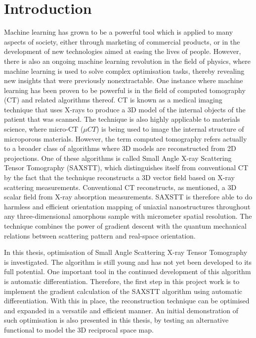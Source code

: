 \chapter{Introduction}


Machine learning has grown to be a powerful tool which is applied to many aspects of society,
either through marketing of commercial products, or in the development of new technologies aimed at easing the lives of people.
However, there is also an ongoing machine learning revolution in the field of physics,
where machine learning is used to solve complex optimisation tasks, thereby revealing new insights that were previously nonextractable.
One instance where machine learning has been proven to be powerful is in the field of computed tomography (CT) and related algorithms thereof.
CT is known as a medical imaging technique that uses X-rays to produce a 3D model of the internal objects of the patient that was scanned.
The technique is also highly applicable to materials science, where micro-CT ($\mu CT$) is being used to image the internal structure of microporous materials.
However, the term computed tomography refers actually to a broader class of algorithms where 3D models are reconstructed from 2D projections.
One of these algorithms is called Small Angle X-ray Scattering Tensor Tomography (SAXSTT), which distinguishes itself from conventional CT by the fact that the technique
reconstructs a 3D vector field based on X-ray scattering measurements. Conventional CT reconstructs, as mentioned, a 3D scalar field from X-ray absorption measurements.
SAXSTT is therefore able to do harmless and efficient orientation mapping of uniaxial nanostructures throughout any three-dimensional amorphous sample with micrometer spatial resolution.
The technique combines the power of gradient descent with the quantum mechanical relations between scattering pattern and real-space orientation.

In this thesis, optimisation of Small Angle Scattering X-ray Tensor Tomography is investigated.
The algorithm is still young and has not yet been developed to its full potential.
One important tool in the continued development of this algorithm is automatic differentiation.
Therefore, the first step in this project work is to implement the gradient calculation of the SAXSTT algorithm using automatic differentiation.
With this in place, the reconstruction technique can be optimised and expanded in a versatile and efficient manner.
An initial demonstration of such optimisation is also presented in this thesis, by testing an alternative functional to model the 3D reciprocal space map.